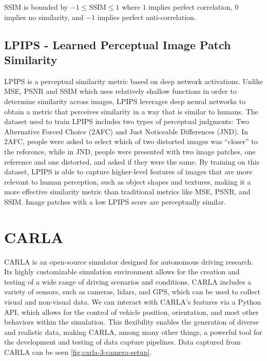 SSIM is bounded by $-1 \leq \text{SSIM} \leq 1$ where $1$ implies perfect correlation, $0$ implies no similarity, and $-1$ implies perfect anti-correlation.


\subsection{LPIPS - Learned Perceptual Image Patch Similarity}
LPIPS \cite{zhang_unreasonable_2018} is a perceptual similarity metric based on deep network activations. Unlike MSE, PSNR and SSIM which uses relatively shallow functions in order to determine similarity across images, LPIPS leverages deep neural networks to obtain a metric that perceives similarity in a way that is similar to humans. The dataset used to train LPIPS includes two types of perceptual judgments: Two Alternative Forced Choice (2AFC) and Just Noticeable Differences (JND). In 2AFC, people were asked to select which of two distorted images was “closer” to the reference, while in JND, people were presented with two image patches, one reference and one distorted, and asked if they were the same. By training on this dataset, LPIPS is able to capture higher-level features of images that are more relevant to human perception, such as object shapes and textures, making it a more effective similarity metric than traditional metrics like MSE, PSNR, and SSIM. Image patches with a low LPIPS score are perceptually similar.





\section{CARLA}

CARLA \cite{Dosovitskiy17} is an open-source simulator designed for autonomous driving research. Its highly customizable simulation environment allows for the creation and testing of a wide range of driving scenarios and conditions. CARLA includes a variety of sensors, such as cameras, lidars, and GPS, which can be used to collect visual and non-visual data. We can interact with CARLA’s features via a Python API, which allows for the control of vehicle position, orientation, and most other behaviors within the simulation. This flexibility enables the generation of diverse and realistic data, making CARLA, among many other things, a powerful tool for the development and testing of data capture pipelines. Data captured from CARLA can be seen \autoref{fig:carla-3-camera-setup}.

